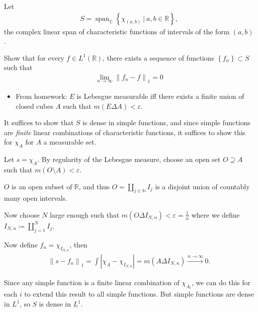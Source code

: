Let
\begin{align*}
S = {\operatorname{span}}_{\mathbb{C}}\left\{{\chi_{(a, b)} {~\mathrel{\Big|}~}a, b \in {\mathbb{R}}}\right\},
\end{align*}
the complex linear span of characteristic functions of intervals of the
form \((a, b)\).

Show that for every \(f\in L^1({\mathbb{R}})\), there exists a sequence
of functions \(\left\{{f_n}\right\} \subset S\) such that
\begin{align*}
\lim _{n \rightarrow \infty}\left\|f_{n}-f\right\|_{1}=0
\end{align*}


\begin{solution}

\hfill

\begin{concept}

\hfill

\begin{itemize}
\tightlist
\item
  From homework: \(E\) is Lebesgue measurable iff there exists a finite
  union of closed cubes \(A\) such that \(m(E\Delta A) < \varepsilon\).
\end{itemize}

\end{concept}

It suffices to show that \(S\) is dense in simple functions, and since
simple functions are \emph{finite} linear combinations of characteristic
functions, it suffices to show this for \(\chi_A\) for \(A\) a
measurable set.

Let \(s = \chi_{A}\). By regularity of the Lebesgue measure, choose an
open set \(O \supseteq A\) such that \(m(O\setminus A) < \varepsilon\).

\(O\) is an open subset of \({\mathbb{R}}\), and thus
\(O = {\coprod}_{j\in {\mathbb{N}}} I_j\) is a disjoint union of
countably many open intervals.

Now choose \(N\) large enough such that
\(m(O \Delta I_{N, n}) < \varepsilon = \frac 1 n\) where we define
\(I_{N, n} \coloneqq{\coprod}_{j=1}^N I_j\).

Now define \(f_n = \chi_{I_{N, n}}\), then
\begin{align*}
{\left\lVert {s - f_n} \right\rVert}_1 = \int {\left\lvert {\chi_A - \chi_{I_{N, n}}} \right\rvert} = m(A \Delta I_{N, n}) \overset{n\to\infty}\longrightarrow 0
.\end{align*}

Since any simple function is a finite linear combination of
\(\chi_{A_i}\), we can do this for each \(i\) to extend this result to
all simple functions. But simple functions are dense in \(L^1\), so
\(S\) is dense in \(L^1\).

\end{solution}

